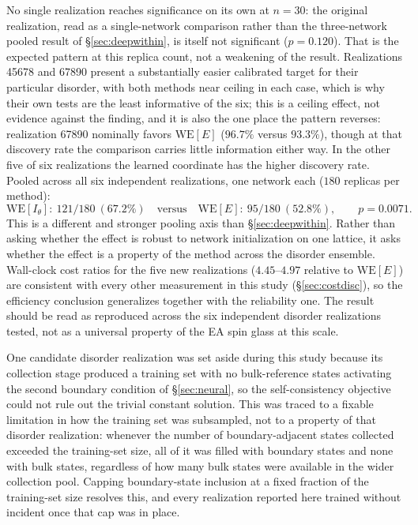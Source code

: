 \documentclass[a4paper,fleqn]{cas-sc}
\newcommand{\WE}{\mathrm{WE}}
\begin{document}
No single realization reaches significance on its own at $n=30$: the original realization,
read as a single-network comparison rather than the three-network pooled result of
\S\ref{sec:deepwithin}, is itself not significant ($p=0.120$). That is the expected pattern at
this replica count, not a weakening of the result. Realizations 45678 and 67890 present a
substantially easier calibrated target for their particular disorder, with both methods near
ceiling in each case, which is why their own tests are the least informative of the six; this
is a ceiling effect, not evidence against the finding, and it is also the one place the pattern
reverses: realization 67890 nominally favors $\WE[E]$ ($96.7\%$ versus $93.3\%$), though at
that discovery rate the comparison carries little information either way. In the other five of
six realizations the learned coordinate has the higher discovery rate. Pooled across all six
independent realizations, one network each ($180$ replicas per method):
\begin{equation}
\WE[I_\theta]:\ 121/180\ (67.2\%) \quad\text{versus}\quad \WE[E]:\ 95/180\ (52.8\%),
\qquad p=0.0071.
\label{eq:disordergen}
\end{equation}
This is a different and stronger pooling axis than \S\ref{sec:deepwithin}. Rather than asking
whether the effect is robust to network initialization on one lattice, it asks whether the
effect is a property of the method across the disorder ensemble. Wall-clock cost ratios for the
five new realizations ($4.45$--$4.97$ relative to $\WE[E]$) are consistent with every other
measurement in this study (\S\ref{sec:costdisc}), so the efficiency conclusion generalizes
together with the reliability one. The result should be read as reproduced across the six
independent disorder realizations tested, not as a universal property of the EA spin glass at
this scale.

One candidate disorder realization was set aside during this study because its collection
stage produced a training set with no bulk-reference states activating the second boundary
condition of \S\ref{sec:neural}, so the self-consistency objective could not rule out the
trivial constant solution. This was traced to a fixable limitation in how the training set was
subsampled, not to a property of that disorder realization: whenever the number of
boundary-adjacent states collected exceeded the training-set size, all of it was filled with
boundary states and none with bulk states, regardless of how many bulk states were available
in the wider collection pool. Capping boundary-state inclusion at a fixed fraction of the
training-set size resolves this, and every realization reported here trained without incident
once that cap was in place.
\end{document}
